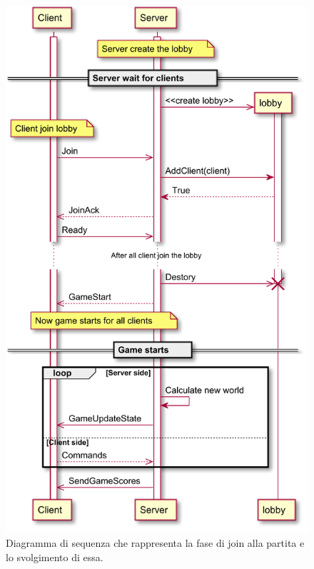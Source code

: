 \begin{figure}[H]
	\centering
	\includegraphics[width=0.80\columnwidth,height=0.95\linewidth]{plantuml/rendered/sequenceDiagrams/sequenceClientServer.pdf}
	\caption{Diagramma di sequenza che rappresenta la fase di join alla partita e lo svolgimento di essa.}
	\label{fig:sequenceClientServer}
\end{figure}








